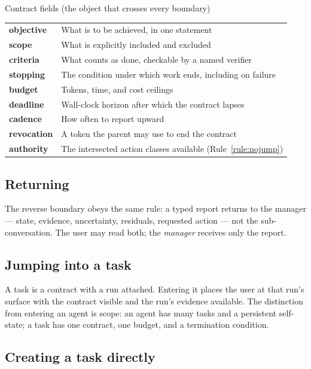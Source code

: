 \documentclass[11pt]{article}
\begin{document}
\begin{specbox}{Contract fields (the object that crosses every boundary)}
\begin{tabular}{@{}L{2.6cm}L{10.2cm}@{}}
\textbf{objective} & What is to be achieved, in one statement \\
\textbf{scope} & What is explicitly included and excluded \\
\textbf{criteria} & What counts as done, checkable by a named verifier \\
\textbf{stopping} & The condition under which work ends, including on failure \\
\textbf{budget} & Tokens, time, and cost ceilings \\
\textbf{deadline} & Wall-clock horizon after which the contract lapses \\
\textbf{cadence} & How often to report upward \\
\textbf{revocation} & A token the parent may use to end the contract \\
\textbf{authority} & The intersected action classes available (Rule~\ref{rule:nojump}) \\
\end{tabular}
\end{specbox}

\subsection{Returning}

The reverse boundary obeys the same rule: a typed report returns to the manager --- state, evidence, uncertainty, residuals, requested action --- not the sub-conversation. The user may read both; the \emph{manager} receives only the report.

\subsection{Jumping into a task}

A task is a contract with a run attached. Entering it places the user at that run's surface with the contract visible and the run's evidence available. The distinction from entering an agent is scope: an agent has many tasks and a persistent self-state; a task has one contract, one budget, and a termination condition.

\subsection{Creating a task directly}
\end{document}
